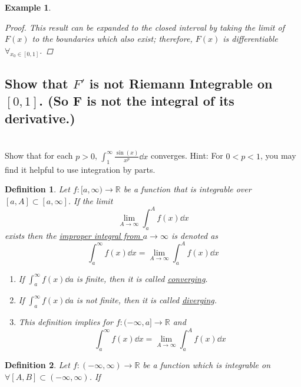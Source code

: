 \documentclass[]{article}
\newcommand{\R}{\mathbb{R}}
\newtheorem{definition}{Definition}
\newtheorem{example}{Example}
\begin{document}
\begin{example}
\begin{proof}
        This result can be expanded to the closed interval by taking the limit of $F(x)$ to the boundaries which also exist; therefore, $F(x)$ is differentiable $\forall_{x_0 \in [0,1]}$.
    \end{proof}
    \subsection{Show that $F'$ is not Riemann Integrable on $[0,1]$. (So F is not the integral of its derivative.)}



\end{example}




\newpage
\section{}
Show that for each $p > 0$, $\int_{1}^{\infty} \frac{\sin(x)}{x^p} \dd{x}$ converges.
Hint: For $0<p<1$, you may find it helpful to use integration by parts.

\begin{definition}
    Let $f : [a,\infty) \to \R$ be a function that is integrable over $[a,A] \subset [a,\infty]$.
    If the limit\[
        \lim_{A\to \infty} \int_{a}^{A} f(x) \dd{x}
    \] exists then the \emph{\underline{improper integral from $a \to \infty$}} is denoted as \[
        \int_{a}^{\infty} f(x) \dd{x} = \lim_{A\to \infty} \int_{a}^{A} f(x) \dd{x}
    \]
    \begin{enumerate}
        \item If $\int_{a}^{\infty} f(x) \dd{a}$ is finite, then it is called \emph{\underline{converging}}.
        \item If $\int_{a}^{\infty} f(x) \dd{a}$ is not finite, then it is called \emph{\underline{diverging}}.
        \item This definition implies for $f : (-\infty, a] \to \R$ and \[
            \int_{a}^{\infty} f(x) \dd{x} = \lim_{A\to \infty} \int_{a}^{A} f(x) \dd{x}
        \]
    \end{enumerate}
\end{definition}

\begin{definition}
    Let $f:(-\infty,\infty) \to \R$ be a function which is integrable on $\forall [A,B] \subset (-\infty,\infty)$.
    If 
\end{definition}
\end{document}

